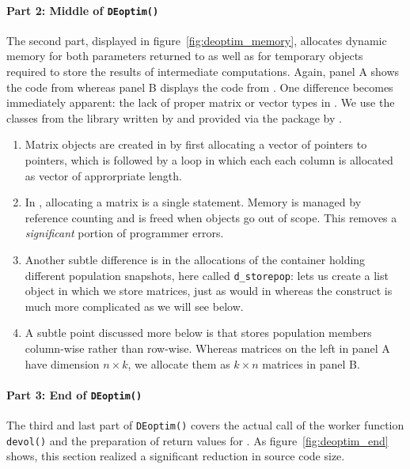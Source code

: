\documentclass[nojss,shortnames,article]{jss}
\begin{document}
\paragraph{Part 2: Middle of \texttt{DEoptim()}} The second part,
displayed in figure~\ref{fig:deoptim_memory}, allocates dynamic memory for
both parameters returned to  as well as for temporary objects
required to store the results of intermediate computations.  Again, panel A
shows the  code from  whereas panel B displays the
 code from .  One difference becomes immediately apparent: the lack
of proper matrix or vector types in . We use the classes from the
  library written by
\cite{Sanderson:2010:Armadillo} and provided via the  package
 by \citet{CRAN:RcppArmadillo}.
\begin{enumerate}
\item Matrix objects are created in  by first allocating a vector
  of pointers to pointers, which is followed by a loop in which each each
  column is allocated as vector of approrpriate length.
\item In , allocating a matrix is a single statement. Memory is
  managed by reference counting and is freed when objects go out of
  scope. This removes a \textsl{significant} portion of programmer errors.
\item Another subtle difference is in the allocations of the container
  holding different population snapshots, here called \texttt{d\_storepop}:
   lets us create a list object in which we store matrices, just as
  would in  whereas the  construct is much more
  complicated as we will see below.
\item A subtle point discussed more below is that  stores
  population members column-wise rather than row-wise. Whereas matrices on the
  left in panel A have dimension $n \times k$, we allocate them as $k \times
  n$ matrices in panel B.
\end{enumerate}

\paragraph{Part 3: End of \texttt{DEoptim()}} The third and last part of
\verb|DEoptim()| covers the actual call of the worker function \verb|devol()|
and the preparation of return values for . As
figure~\ref{fig:deoptim_end} shows, this section realized a significant
reduction in source code size.
\end{document}
